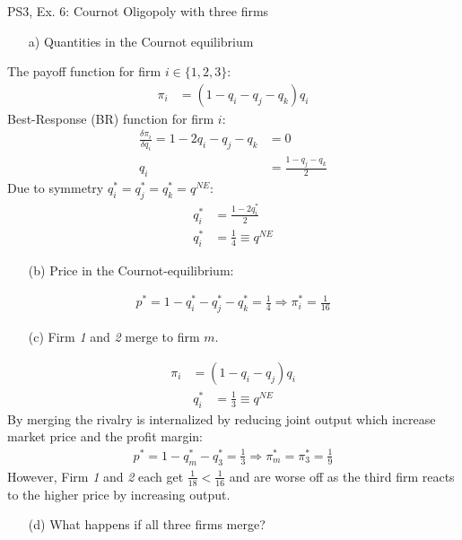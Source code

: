 \begin{frame}{PS3, Ex. 6: Cournot Oligopoly with three firms}
  \begin{multicols}{2}
    \begin{itemize}
      \item[a)] Quantities in the Cournot equilibrium
    \end{itemize}
    The payoff function for firm $i\in\{1,2,3\}$:
    \begin{align*}
        \pi_i&=(1-q_i-q_j-q_k)q_i
    \end{align*}
    Best-Response (BR) function for firm $i$:
    \begin{align*}
        \frac{\delta\pi_i}{\delta q_i}=1-2q_i-q_j-q_k&=0\\
                                                  q_i&=\frac{1-q_j-q_k}{2}
    \end{align*}
    Due to symmetry $q_i^{*}=q_j^{*}=q_k^{*}=q^{NE}$:
    \begin{align*}
        q_i^{*} &= \frac{1-2q_i^{*}}{2}\\
        q_i^{*} &= \frac{1}{4}\equiv q^{NE}
    \end{align*}
    \begin{itemize}
      \item[(b)] Price in the Cournot-equilibrium:
    \end{itemize}
    \begin{align*}
      p^{*}=1-q_i^{*}-q_j^{*}-q_k^{*}=\frac{1}{4}\Rightarrow\pi_i^{*}=\frac{1}{16}
    \end{align*}
  \vfill\null \columnbreak
    \begin{itemize}
      \item[(c)] Firm \textit{1} and \textit{2} merge to firm $m$.
    \end{itemize}
    \begin{align*}
        \pi_i&=(1-q_i-q_j)q_i
    \end{align*}
    \begin{align*}
        q_i^{*} &= \frac{1}{3}\equiv q^{NE}
    \end{align*}
    By merging the rivalry is internalized by reducing joint output which increase market price and the profit margin:
    \begin{align*}
      p^{*}=1-q_m^{*}-q_3^{*}=\frac{1}{3}\Rightarrow\pi_m^{*}=\pi_3^{*}=\frac{1}{9}
    \end{align*}
    However, Firm \textit{1} and \textit{2} each get $\frac{1}{18}<\frac{1}{16}$ and are worse off as the third firm reacts to the higher price by increasing output.
    \begin{itemize}
      \item[(d)] What happens if all three firms merge?
    \end{itemize}
  \vfill\null
  \end{multicols}
\end{frame}
